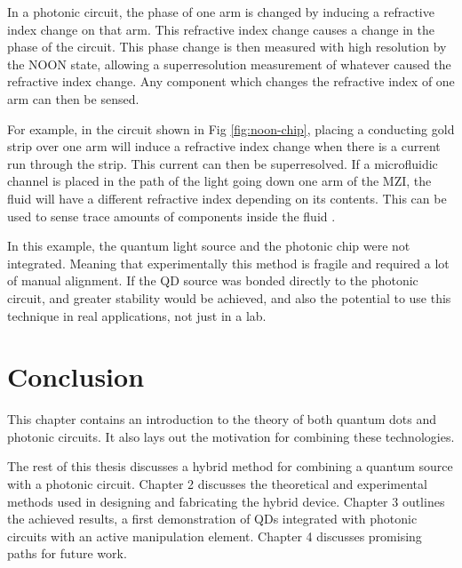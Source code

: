 In a photonic circuit, the phase of one arm is changed by inducing a
refractive index  change on that arm. This refractive index change causes a
change in the phase of  the circuit. This phase change is then measured with
high resolution by the NOON state, allowing a superresolution measurement of
whatever caused the refractive index change. Any component which changes the
refractive index of one arm can then be sensed.

For example, in the circuit shown in Fig \ref{fig:noon-chip},  placing a
conducting gold strip over one arm will induce a refractive index change when
there is a current run through the strip. This current can then be
superresolved. If a microfluidic channel is placed in the path of the light
going down one arm of the MZI, the fluid will have a different refractive index
depending on its contents. This can be used to sense trace amounts of components
inside the fluid \cite{crespi2012measuring}.

In this example, the quantum light source and the photonic chip were not integrated. Meaning
that experimentally this method is fragile and required a lot of manual alignment. If the QD source
was bonded directly to the photonic circuit, and greater stability would be achieved, and also
the potential to use this technique in real applications, not just in a lab.

\section{Conclusion}
This chapter contains an introduction to the theory of both quantum dots and
photonic circuits. It also lays out the motivation for combining these
technologies.

The rest of this thesis discusses a hybrid method for combining a quantum source
with a photonic circuit. Chapter 2 discusses the theoretical and experimental
methods used in designing and fabricating the hybrid device. Chapter 3 outlines
the achieved results, a first demonstration of QDs integrated with photonic
circuits with an active manipulation element. Chapter 4 discusses promising
paths for future work.
